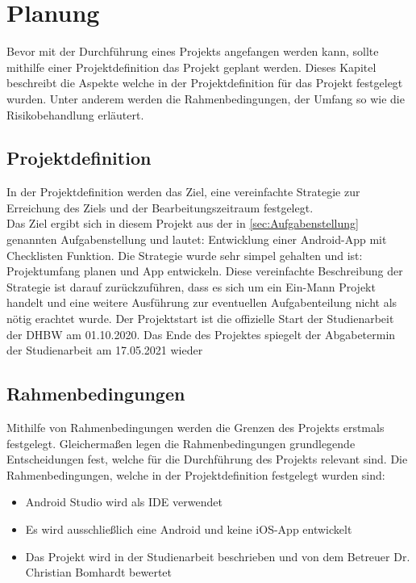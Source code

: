\chapter{Planung} \label{chpt:planung}

Bevor mit der Durchführung eines Projekts angefangen werden kann, sollte mithilfe einer Projektdefinition das Projekt geplant werden. Dieses Kapitel beschreibt die Aspekte welche in der Projektdefinition für das Projekt festgelegt wurden. Unter anderem werden die Rahmenbedingungen, der Umfang so wie die Risikobehandlung erläutert.

\section{Projektdefinition}\label{sec:projektdef}
In der Projektdefinition werden das Ziel, eine vereinfachte Strategie zur Erreichung des Ziels und der Bearbeitungszeitraum festgelegt.\\
Das Ziel ergibt sich in  diesem Projekt aus der in \autoref{sec:Aufgabenstellung} genannten Aufgabenstellung und lautet: \glqq Entwicklung einer Android-App mit Checklisten Funktion\grqq.
Die Strategie wurde sehr simpel gehalten und ist: \glqq Projektumfang planen und App entwickeln\grqq. Diese vereinfachte Beschreibung der Strategie ist darauf zurückzuführen, dass es sich um ein Ein-Mann Projekt handelt und eine weitere Ausführung zur eventuellen Aufgabenteilung nicht als nötig erachtet wurde.
Der Projektstart ist die offizielle Start der Studienarbeit der \ac{DHBW} am 01.10.2020. Das Ende des Projektes spiegelt der Abgabetermin der Studienarbeit am 17.05.2021 wieder

\section{Rahmenbedingungen}\label{sec:rehamen}
Mithilfe von Rahmenbedingungen werden die Grenzen des Projekts erstmals festgelegt. Gleichermaßen legen die Rahmenbedingungen grundlegende Entscheidungen fest, welche für die Durchführung des Projekts relevant sind. Die Rahmenbedingungen, welche in der Projektdefinition festgelegt wurden sind:

\begin{itemize}
	\item Android Studio wird als \ac{IDE} verwendet
	\item Es wird ausschließlich eine Android und keine iOS-App entwickelt
	\item Das Projekt wird in der Studienarbeit beschrieben und von dem Betreuer Dr. Christian Bomhardt bewertet
\end{itemize}

